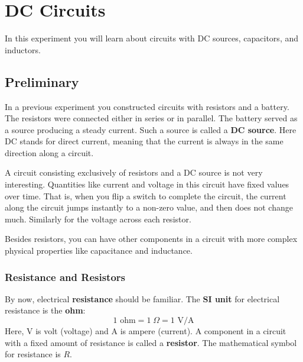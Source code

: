 \setcounter{chapter}{4}
\chapter{DC Circuits}
In this experiment you will learn about circuits with DC sources, capacitors, and inductors.
\section{Preliminary}
In a previous experiment you constructed circuits with resistors and a battery. The resistors were connected either in series or in parallel. The battery served as a source producing a steady current. Such a source is called a \textbf{DC source}. Here DC stands for direct current, meaning that the current is always in the same direction along a circuit.

A circuit consisting exclusively of resistors and a DC source is not very interesting. Quantities like current and voltage in this circuit have fixed values over time. That is, when you flip a switch to complete the circuit, the current along the circuit jumps instantly to a non-zero value, and then does not change much. Similarly for the voltage across each resistor.

Besides resistors, you can have other components in a circuit with more complex physical properties like capacitance and inductance.
\subsection{Resistance and Resistors}
By now, electrical \textbf{resistance} should be familiar. The \textbf{SI unit} for electrical resistance is the \textbf{ohm}:
\begin{equation}
	1 \text{ ohm} = 1\;\Omega = 1 \text{ V/A}
\end{equation}
Here, V is volt (voltage) and A is ampere (current). A component in a circuit with a fixed amount of resistance is called a \textbf{resistor}. The mathematical symbol for resistance is $R$.
